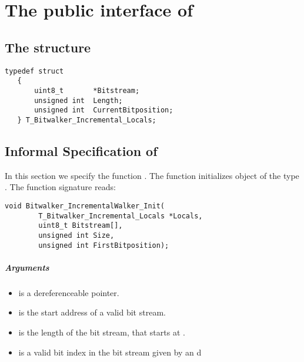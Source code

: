 

\chapter{The public interface of \bitwalker}

\section{The structure \bitwalkertype}


\begin{lstlisting}[style=acsl-block]
   typedef struct
   {
       uint8_t       *Bitstream;
       unsigned int  Length;
       unsigned int  CurrentBitposition;
   } T_Bitwalker_Incremental_Locals;
\end{lstlisting}


\clearpage

\section{Informal Specification of }

In this section we specify the function \init.  The function  initializes object of the type \locals.
The function signature reads:


\begin{lstlisting}[style=acsl-block]
void Bitwalker_IncrementalWalker_Init(
        T_Bitwalker_Incremental_Locals *Locals,
        uint8_t Bitstream[],
        unsigned int Size,
        unsigned int FirstBitposition);
\end{lstlisting}


\paragraph{Arguments}
\begin{itemize}
    \item  {} is a dereferenceable pointer.
   \item {} is  the start address of a valid bit stream.
   \item {} is the length of the bit stream, that starts at .
   \item {} is a valid bit index in the bit stream given by  an d 
\end{itemize}

